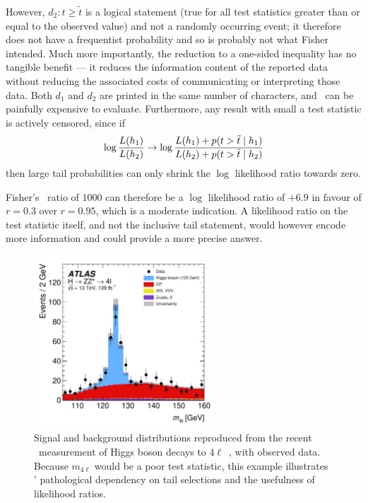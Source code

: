 However, $d_2: t \geq \tilde{t}$ is a logical statement (true for all test
statistics greater than or equal to the observed value) and not a randomly
occurring event; it therefore does not have a frequentist probability and so
is probably not what Fisher intended.
Much more importantly, the reduction to a one-sided inequality has no tangible
benefit --- it reduces the information content of the reported data without
reducing the associated costs of communicating or interpreting those data.
Both $d_1$ and $d_2$ are printed in the same number of characters, and
\pvalues\ can be painfully expensive to evaluate.
Furthermore, any result with small a test statistic is actively censored,
since if
\begin{equation}
\log \frac{L(h_1)}{L(h_2)}
\to
\log \frac{
L(h_1) + p(t > \tilde{t} \mid h_1)
}
{
L(h_2) + p(t > \tilde{t} \mid h_2)
}
\end{equation}
then large tail probabilities can only shrink the $\log$ likelihood ratio
towards zero.

Fisher's \pvalue\ ratio of $1000$ can therefore be a $\log$ likelihood
ratio of $+6.9$ in favour of $r=0.3$ over $r=0.95$, which is a moderate
indication.
A likelihood ratio on the test statistic itself, and not the inclusive
tail statement, would however encode more information and could provide a
more precise answer.

\begin{figure}[tp]
\centering
\includegraphics[width=0.6\textwidth]{figures/searches_atlas_higgs_4l_2207_00320.pdf}
\caption[
Signal and background distributions reproduced from the recent \atlas\
measurement of Higgs boson decays to $4\ell$
]{%
Signal and background distributions reproduced from the recent \atlas\
measurement of Higgs boson decays to $4\ell$~\cite{ATLAS:2022net}, with
observed data.
Because $m_{4\ell}$ would be a poor test statistic, this example illustrates
\pvalues' pathological dependency on tail selections and the usefulness of
likelihood ratios.
}
\label{fig:searches_atlas_higgs_4l}
\end{figure}

